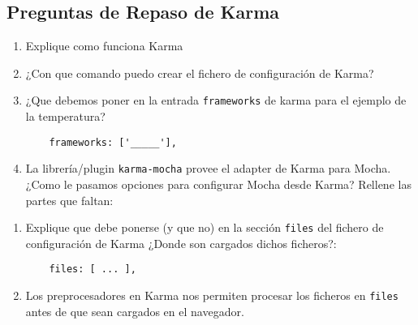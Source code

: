 \subsection{Preguntas de Repaso de
Karma}\label{preguntas-de-repaso-de-karma}

\begin{enumerate}
\def\labelenumi{\arabic{enumi}.}
\item
  Explique como funciona Karma
\item
  ¿Con que comando puedo crear el fichero de configuración de Karma?
\item
  ¿Que debemos poner en la entrada \texttt{frameworks} de karma para el
  ejemplo de la temperatura?

\begin{verbatim}
    frameworks: ['_____'],
\end{verbatim}
\item
  La librería/plugin \texttt{karma-mocha} provee el adapter de Karma
  para Mocha. ¿Como le pasamos opciones para configurar Mocha desde
  Karma? Rellene las partes que faltan:
\end{enumerate}

\begin{Shaded}
\begin{Highlighting}[]
  \NormalTok{: [}\NormalTok{, }\NormalTok{], }
  \NormalTok{: \{}
    \DataTypeTok{__}\NormalTok{: }
  \NormalTok{\}}
\NormalTok{\},}
\end{Highlighting}
\end{Shaded}

\begin{enumerate}
\def\labelenumi{\arabic{enumi}.}
\setcounter{enumi}{4}
\item
  Explique que debe ponerse (y que no) en la sección \texttt{files} del
  fichero de configuración de Karma ¿Donde son cargados dichos
  ficheros?:

\begin{verbatim}
    files: [ ... ],
\end{verbatim}
\item
  Los preprocesadores en Karma nos permiten procesar los ficheros en
  \texttt{files} antes de que sean cargados en el navegador.
\end{enumerate}

\begin{Shaded}
\begin{Highlighting}[]
            \NormalTok{: }\NormalTok{,}
            \NormalTok{: }
          \NormalTok{\};}
\end{Highlighting}
\end{Shaded}

